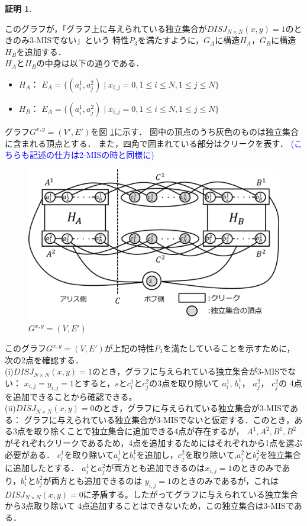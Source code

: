 \documentclass[12pt]{thesis}
\newcommand{\Izumi}[1]{\textcolor{blue}{(#1)}}
\theoremstyle{definition}
\newtheorem*{prf*}{証明}
\begin{document}
\begin{prf*}
\begin{itemize}
\end{itemize}
このグラフが，「グラフ上に与えられている独立集合が$DISJ_{N \times N} (x, y) = 1$のときのみ3-MISでない」という
特性$P_{3}$を満たすように，$G_{A}$に構造$H_{A}$，$G_{B}$に構造$H_{B}$を追加する．\\
$H_{A}$と$H_{B}$の中身は以下の通りである．
\begin{itemize}
\item $H_{A}$： $E_{A}=\{(a^{1}_{i},a^{2}_{j}) \mid x_{i,j}=0, 1 \leq i \leq N, 1 \leq j \leq N\}$
\item $H_{B}$： $E_{A}=\{(a^{1}_{i},a^{2}_{j}) \mid x_{i,j}=0, 1 \leq i \leq N, 1 \leq j \leq N\}$
\end{itemize}
グラフ$G^{x, y} = (V', E')$を図 \ref{3_G(x,y)}に示す．
図中の頂点のうち灰色のものは独立集合に含まれる頂点とする．
また，四角で囲まれている部分はクリークを表す．
\Izumi{こちらも記述の仕方は2-MISの時と同様に}

\begin{figure}[ht]
\begin{center}
\includegraphics[width=120mm]{3_Gxy.png}
\end{center}
\caption{$G^{x, y} = (V, E')$}
\label{3_G(x,y)}
\end{figure}

このグラフ$G^{x, y} = (V, E')$が上記の特性$P_{3}$を満たしていることを示すために，次の2点を確認する． \\
(i)$DISJ_{N \times N} (x, y) = 1$のとき，グラフに与えられている独立集合が3-MISでない： 
$x_{i, j} = y_{i, j} =1$とすると，$s$と$c_{i}^{1}$と$c_{j}^{2}$の3点を取り除いて
$a_{i}^{1}$, $b_{i}^{1}$， $a_{j}^{2}$， $c_{j}^{2}$の
4点を追加できることから確認できる。 \\
(ii)$DISJ_{N \times N} (x, y) = 0$のとき，グラフに与えられている独立集合が3-MISである： 
グラフに与えられている独立集合が3-MISでないと仮定する．このとき，ある3点を取り除くことで独立集合に追加できる4点が存在するが，
$A^{1}, A^{2}, B^{1}, B^{2}$がそれぞれクリークであるため，4点を追加するためにはそれぞれから1点を選ぶ必要がある．
$c_{i}^{1}$を取り除いて$a_{i}^{1}$と$b_{i}^{1}$を追加し，$c_{j}^{2}$を取り除いて,$a_{j}^{2}$と$b_{j}^{2}$を独立集合に追加したとする．
$a_{i}^{1}$と$a_{j}^{2}$が両方とも追加できるのは$x_{i, j} = 1$のときのみであり，$b_{i}^{1}$と$b_{j}^{2}$が両方とも追加できるのは
$y_{i, j} = 1$のときのみであるが，これは$DISJ_{N \times N} (x, y) = 0$に矛盾する。したがってグラフに与えられている独立集合から3点取り除いて
4点追加することはできないため，この独立集合は3-MISである．


\end{prf*}
\end{document}
